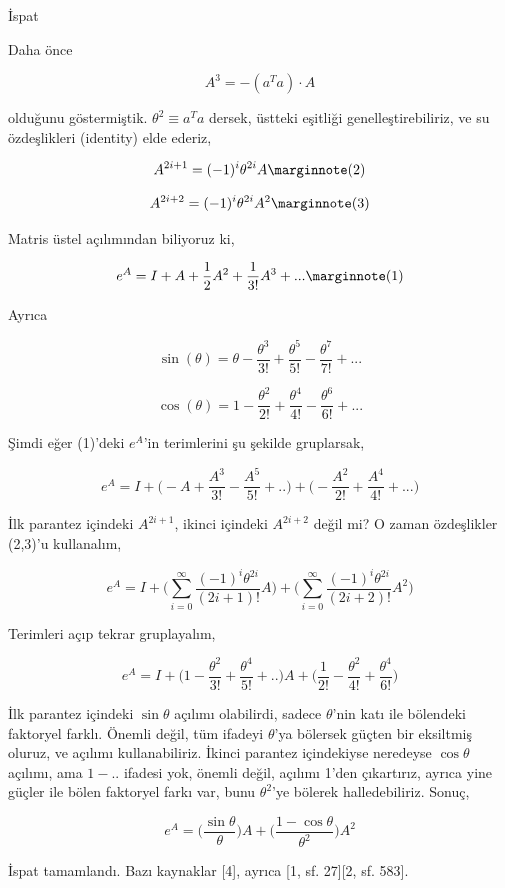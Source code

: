 \documentclass[12pt,fleqn]{article}\usepackage{../../common}
\begin{document}
İspat

Daha önce

$$ A^3 = -(a^Ta) \cdot A $$

olduğunu göstermiştik. $\theta^2 \equiv a^Ta$ dersek, üstteki eşitliği
genelleştirebiliriz, ve su özdeşlikleri (identity) elde ederiz,

$$ 
A^{2i+1} = (-1)^i \theta^{2i} A 
\mlabel{2} 
$$

$$ 
A^{2i+2} = (-1)^i \theta^{2i} A^2 
\mlabel{3} 
$$

Matris üstel açılımından biliyoruz ki,

$$ e^{A} =  I + A + \frac{1}{2}A^2 + \frac{1}{3!}A^3 + ...
\mlabel{1}
$$

Ayrıca

$$ \sin(\theta) = \theta - \frac{\theta^3}{3!} + \frac{\theta^5}{5!} - \frac{\theta^7}{7!} + ...$$

$$ \cos(\theta) = 1 - \frac{\theta^2}{2!} + \frac{\theta^4}{4!} - \frac{\theta^6}{6!} + ... $$

Şimdi eğer (1)'deki $e^A$'in terimlerini şu şekilde gruplarsak,

$$ e^A = I 
+ \bigg( - A + \frac{A^3}{3!} - \frac{A^5}{5!} + .. \bigg) 
+ \bigg( - \frac{A^2}{2!} + \frac{A^4}{4!} + ...  \bigg)  
$$

İlk parantez içindeki $A^{2i+1}$, ikinci içindeki $A^{2i+2}$ değil mi?
O zaman özdeşlikler (2,3)'u kullanalım,

$$ e^A = I 
+ \bigg( \sum_{i=0}^{\infty} \frac{(-1)^i \theta^{2i}}{(2i+1)!} A\bigg) 
+ \bigg( \sum_{i=0}^{\infty} \frac{(-1)^i \theta^{2i}}{(2i+2)!} A^2\bigg) 
$$

Terimleri açıp tekrar gruplayalım,

$$ e^A = I 
+ \bigg( 1 - \frac{\theta^2}{3!} + \frac{\theta^4}{5!} + .. \bigg) A
+ \bigg( \frac{1}{2!} - \frac{\theta^2}{4!} + \frac{\theta^4}{6!} \bigg)  
$$

İlk parantez içindeki $\sin \theta$ açılımı olabilirdi, sadece $\theta$'nin
katı ile bölendeki faktoryel farklı. Önemli değil, tüm ifadeyi $\theta$'ya
bölersek güçten bir eksiltmiş oluruz, ve açılımı kullanabiliriz. İkinci
parantez içindekiyse neredeyse $\cos \theta$ açılımı, ama $1 - ..$ ifadesi
yok, önemli değil, açılımı 1'den çıkartırız, ayrıca yine güçler ile bölen
faktoryel farkı var, bunu $\theta^2$'ye bölerek halledebiliriz. Sonuç, 

$$ e^A = \bigg( \frac{\sin \theta}{\theta} \bigg) A + 
\bigg( \frac{1-\cos \theta}{\theta^2} \bigg) A^2
$$

İspat tamamlandı. Bazı kaynaklar [4], ayrıca [1, sf. 27][2, sf. 583]. 
\end{document}
